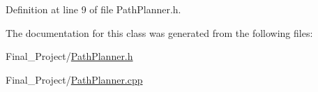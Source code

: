 Definition at line 9 of file Path\-Planner.\-h.



The documentation for this class was generated from the following files\-:\begin{DoxyCompactItemize}
\item 
Final\-\_\-\-Project/\hyperlink{PathPlanner_8h}{Path\-Planner.\-h}\item 
Final\-\_\-\-Project/\hyperlink{PathPlanner_8cpp}{Path\-Planner.\-cpp}\end{DoxyCompactItemize}
